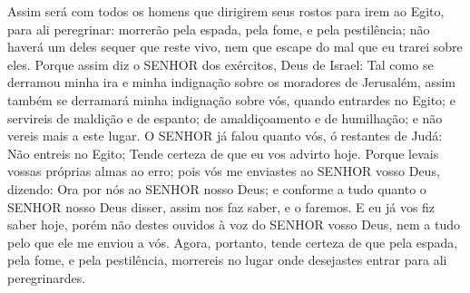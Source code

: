 {Assim será com todos os homens que dirigirem seus rostos para irem ao Egito, para ali peregrinar: morrerão pela espada, pela fome, e pela pestilência; não haverá um deles sequer que reste vivo, nem que escape do mal que eu trarei sobre eles.
Porque assim diz o SENHOR dos exércitos, Deus de Israel: Tal como se derramou minha ira e minha indignação sobre os moradores de Jerusalém, assim também se derramará minha indignação sobre vós, quando entrardes no Egito; e servireis de maldição e de espanto; de amaldiçoamento e de humilhação; e não vereis mais a este lugar.
O SENHOR já falou quanto vós, ó restantes de Judá: Não entreis no Egito; Tende certeza de que eu vos advirto hoje.
Porque levais vossas próprias almas ao erro; pois vós me enviastes ao SENHOR vosso Deus, dizendo: Ora por nós ao SENHOR nosso Deus; e conforme a tudo quanto o SENHOR nosso Deus disser, assim nos faz saber, e o faremos.
E eu já vos fiz saber hoje, porém não destes ouvidos à voz do SENHOR vosso Deus, nem a tudo pelo que ele me enviou a vós.
Agora, portanto, tende certeza de que pela espada, pela fome, e pela pestilência, morrereis no lugar onde desejastes entrar para ali peregrinardes.

\par }

